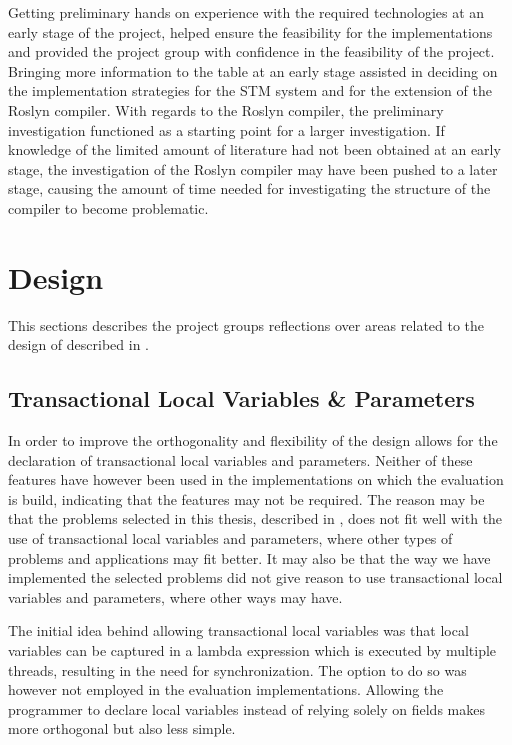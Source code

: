 Getting preliminary hands on experience with the required technologies at an early stage of the project, helped ensure the feasibility for the implementations and provided the project group with confidence in the feasibility of the project. Bringing more information to the table at an early stage assisted in deciding on the implementation strategies for the \ac{STM} system and for the extension of the Roslyn compiler. With regards to the Roslyn compiler, the preliminary investigation functioned as a starting point for a larger investigation. If knowledge of the limited amount of literature had not been obtained at an early stage, the investigation of the Roslyn compiler may have been pushed to a later stage, causing the amount of time needed for investigating the structure of the compiler to become problematic.

\section{Design}\label{sec:reflection_design}
This sections describes the project groups reflections over areas related to the design of \stmname described in . 

\subsection{Transactional Local Variables \& Parameters}
In order to improve the orthogonality and flexibility of \stmname the design allows for the declaration of transactional local variables and parameters. Neither of these features have however been used in the implementations on which the evaluation is build, indicating that the features may not be required. The reason may be that the problems selected in this thesis, described in , does not fit well with the use of transactional local variables and parameters, where other types of problems and applications may fit better. It may also be that the way we have implemented the selected problems did not give reason to use transactional local variables and parameters, where other ways may have.

The initial idea behind allowing transactional local variables was that local variables can be captured in a lambda expression which is executed by multiple threads, resulting in the need for synchronization. The option to do so was however not employed in the evaluation implementations. Allowing the programmer to declare  local variables instead of relying solely on  fields makes \stmnamesp more orthogonal but also less simple.

